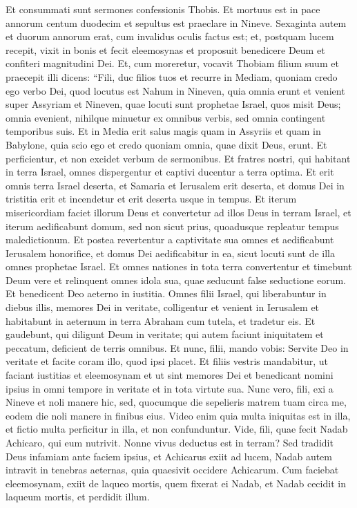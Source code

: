 \begin{biblechapter}  
\verse Et consummati sunt sermones confessionis Thobis. Et mortuus est in pace annorum centum duodecim et sepultus est praeclare in Nineve. 
\verse Sexaginta autem et duorum annorum erat, cum invalidus oculis factus est; et, postquam lucem recepit, vixit in bonis et fecit eleemosynas et proposuit benedicere Deum et confiteri magnitudini Dei. 
\verse Et, cum moreretur, vocavit Thobiam filium suum et praecepit illi dicens: “Fili, duc filios tuos 
\verse et recurre in Mediam, quoniam credo ego verbo Dei, quod locutus est Nahum in Nineven, quia omnia erunt et venient super Assyriam et Nineven, quae locuti sunt prophetae Israel, quos misit Deus; omnia evenient, nihilque minuetur ex omnibus verbis, sed omnia contingent temporibus suis. Et in Media erit salus magis quam in Assyriis et quam in Babylone, quia scio ego et credo quoniam omnia, quae dixit Deus, erunt. Et perficientur, et non excidet verbum de sermonibus. Et fratres nostri, qui habitant in terra Israel, omnes dispergentur et captivi ducentur a terra optima. Et erit omnis terra Israel deserta, et Samaria et Ierusalem erit deserta, et domus Dei in tristitia erit et incendetur et erit deserta usque in tempus. 
\verse Et iterum misericordiam faciet illorum Deus et convertetur ad illos Deus in terram Israel, et iterum aedificabunt domum, sed non sicut prius, quoadusque repleatur tempus maledictionum. Et postea revertentur a captivitate sua omnes et aedificabunt Ierusalem honorifice, et domus Dei aedificabitur in ea, sicut locuti sunt de illa omnes prophetae Israel. 
\verse Et omnes nationes in tota terra convertentur et timebunt Deum vere et relinquent omnes idola sua, quae seducunt false seductione eorum. 
\verse Et benedicent Deo aeterno in iustitia. Omnes filii Israel, qui liberabuntur in diebus illis, memores Dei in veritate, colligentur et venient in Ierusalem et habitabunt in aeternum in terra Abraham cum tutela, et tradetur eis. Et gaudebunt, qui diligunt Deum in veritate; qui autem faciunt iniquitatem et peccatum, deficient de terris omnibus. 
\verse Et nunc, filii, mando vobis: Servite Deo in veritate et facite coram illo, quod ipsi placet. Et filiis vestris mandabitur, ut faciant iustitias et eleemosynam et ut sint memores Dei et benedicant nomini ipsius in omni tempore in veritate et in tota virtute sua.  
\verse Nunc vero, fili, exi a Nineve et noli manere hic, 
\verse sed, quocumque die sepelieris matrem tuam circa me, eodem die noli manere in finibus eius. Video enim quia multa iniquitas est in illa, et fictio multa perficitur in illa, et non confunduntur. Vide, fili, quae fecit Nadab Achicaro, qui eum nutrivit. Nonne vivus deductus est in terram? Sed tradidit Deus infamiam ante faciem ipsius, et Achicarus exiit ad lucem, Nadab autem intravit in tenebras aeternas, quia quaesivit occidere Achicarum. Cum faciebat eleemosynam, exiit de laqueo mortis, quem fixerat ei Nadab, et Nadab cecidit in laqueum mortis, et perdidit illum.  

\end{biblechapter}
